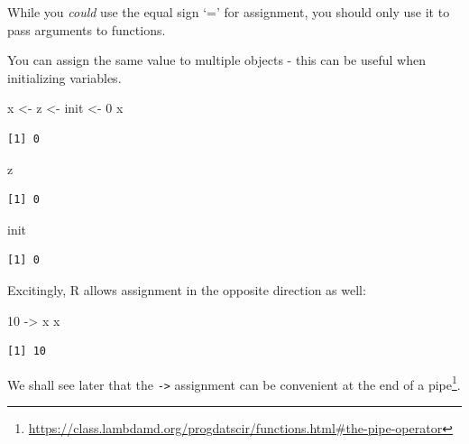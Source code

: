 \documentclass[
]{book}
\makeatletter
\newenvironment{Shaded}{\begin{snugshade}}{\end{snugshade}}
\newcommand{\DecValTok}[1]{\textcolor[rgb]{0.00,0.00,0.81}{#1}}
\newcommand{\NormalTok}[1]{#1}
\newcommand{\OtherTok}[1]{\textcolor[rgb]{0.56,0.35,0.01}{#1}}
\DeclareRobustCommand{\href}[2]{#2\footnote{\url{#1}}}
\renewcommand{\href}[2]{#2\footnote{\url{#1}}}
\newenvironment{kframe}{%
\medskip{}
\setlength{\fboxsep}{.8em}
 \def\at@end@of@kframe{}%
 \ifinner\ifhmode%
  \def\at@end@of@kframe{\end{minipage}}%
  \begin{minipage}{\columnwidth}%
 \fi\fi%
 \def\FrameCommand##1{\hskip\@totalleftmargin \hskip-\fboxsep
 \colorbox{shadecolor}{##1}\hskip-\fboxsep
     \hskip-\linewidth \hskip-\@totalleftmargin \hskip\columnwidth}%
 \MakeFramed {\advance\hsize-\width
   \@totalleftmargin\z@ \linewidth\hsize
   \@setminipage}}%
 {\par\unskip\endMakeFramed%
 \at@end@of@kframe}
\newenvironment{rmdblock}[1]
  {
  \begin{itemize}
  \renewcommand{\labelitemi}{
    \raisebox{-.7\height}[0pt][0pt]{
      {\setkeys{Gin}{width=3em,keepaspectratio}\texttt{[image: images/\#1]}}
    }
  }
  \setlength{\fboxsep}{1em}
  \begin{kframe}
  \item
  }
  {
  \end{kframe}
  \end{itemize}
  }
\newenvironment{note}
  {\begin{rmdblock}{note}}
  {\end{rmdblock}}
\makeatother
\begin{document}
\begin{note}
While you \emph{could} use the equal sign `=' for assignment, you should
only use it to pass arguments to functions.
\end{note}

You can assign the same value to multiple objects - this can be useful when initializing variables.

\begin{Shaded}
\begin{Highlighting}[]
\NormalTok{x }\OtherTok{\textless{}{-}}\NormalTok{ z }\OtherTok{\textless{}{-}}\NormalTok{ init }\OtherTok{\textless{}{-}} \DecValTok{0}
\NormalTok{x}
\end{Highlighting}
\end{Shaded}

\begin{verbatim}
[1] 0
\end{verbatim}

\begin{Shaded}
\begin{Highlighting}[]
\NormalTok{z}
\end{Highlighting}
\end{Shaded}

\begin{verbatim}
[1] 0
\end{verbatim}

\begin{Shaded}
\begin{Highlighting}[]
\NormalTok{init}
\end{Highlighting}
\end{Shaded}

\begin{verbatim}
[1] 0
\end{verbatim}

Excitingly, R allows assignment in the opposite direction as well:

\begin{Shaded}
\begin{Highlighting}[]
\DecValTok{10} \OtherTok{{-}\textgreater{}}\NormalTok{ x}
\NormalTok{x}
\end{Highlighting}
\end{Shaded}

\begin{verbatim}
[1] 10
\end{verbatim}

We shall see later that the \texttt{-\textgreater{}} assignment can be convenient at the end of a \href{https://class.lambdamd.org/progdatscir/functions.html\#the-pipe-operator}{pipe}.
\end{document}
